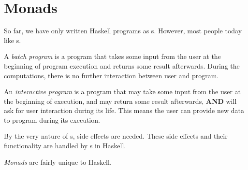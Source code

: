\section{Monads}\label{sec:Monads}
So far, we have only written Haskell programs as s.
However, most people today like s.

\begin{definition}\label{def:Batch_Program}
  A \emph{batch program} is a program that takes some input from the user at the beginning of program execution and returns some result afterwards.
  During the computations, there is no further interaction between user and program.
\end{definition}

\begin{definition}\label{def:Interactive_Program}
  An \emph{interactive program} is a program that may take some input from the user at the beginning of execution, and may return some result afterwards, \textbf{AND} will ask for user interaction during its life.
  This means the user can provide new data to program during its execution.
\end{definition}

By the very nature of s, side effects are needed.
These side effects and their functionality are handled by s in Haskell.

\begin{definition}[Monad]\label{def:Monad}
  \emph{Monads} are fairly unique to Haskell.
\end{definition}

